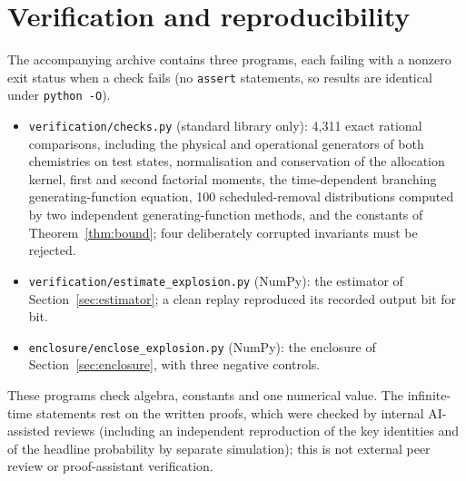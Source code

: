 \documentclass[11pt,a4paper]{article}
\numberwithin{equation}{section}
\theoremstyle{definition}\newtheorem{definition}[theorem]{Definition}
\theoremstyle{remark}\newtheorem{remark}[theorem]{Remark}\newtheorem{example}[theorem]{Example}
\begin{document}
\section{Verification and reproducibility}\label{app:verification}
The accompanying archive contains three programs, each failing with a nonzero exit status when a check fails (no \texttt{assert} statements, so results are identical under \texttt{python -O}).
\begin{itemize}
\item \texttt{verification/checks.py} (standard library only): 4{,}311 exact rational comparisons, including the physical and operational generators of both chemistries on test states, normalisation and conservation of the allocation kernel, first and second factorial moments, the time-dependent branching generating-function equation, 100 scheduled-removal distributions computed by two independent generating-function methods, and the constants of Theorem~\ref{thm:bound}; four deliberately corrupted invariants must be rejected.
\item \texttt{verification/estimate\_explosion.py} (NumPy): the estimator of Section~\ref{sec:estimator}; a clean replay reproduced its recorded output bit for bit.
\item \texttt{enclosure/enclose\_explosion.py} (NumPy): the enclosure of Section~\ref{sec:enclosure}, with three negative controls.
\end{itemize}
These programs check algebra, constants and one numerical value. The infinite-time statements rest on the written proofs, which were checked by internal AI-assisted reviews (including an independent reproduction of the key identities and of the headline probability by separate simulation); this is not external peer review or proof-assistant verification.
\end{document}
